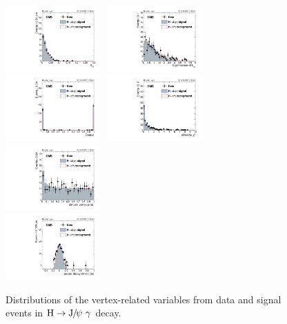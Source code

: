 \begin{figure}[p]
		  \includegraphics[width=0.32\textwidth]{Fig/Final_NoPreliminary/HJpsiG/Rxy_Norm_Inclusive}~
		  \includegraphics[width=0.32\textwidth]{Fig/Final_NoPreliminary/HJpsiG/SLxy_Norm_Inclusive}\\
		  \includegraphics[width=0.32\textwidth]{Fig/Final_NoPreliminary/HJpsiG/CosAlpha_Norm_Inclusive}~
		  \includegraphics[width=0.32\textwidth]{Fig/Final_NoPreliminary/HJpsiG/diMuChi2_Norm_Inclusive}~
		  \includegraphics[width=0.32\textwidth]{Fig/Final_NoPreliminary/HJpsiG/VtxProb_Norm_Inclusive}\\
		  \includegraphics[width=0.32\textwidth]{Fig/Final_NoPreliminary/HJpsiG/ctau_narrowAltBins_Inclusive}\\
		
		  \caption{Distributions of the vertex-related variables from data and signal events in $\mathrm{H}\to {\mathrm{J}\hspace{-.08em}/\hspace{-.14em}\psi}\ \gamma$ decay.}
		  \label{fig:vtx_hjpsig}
		\end{figure}
		\clearpage
		
